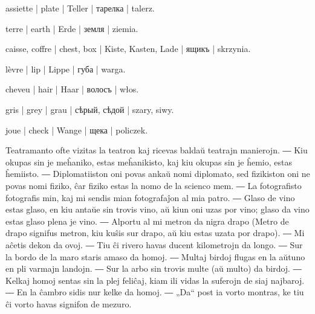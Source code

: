\begin{ekzvocab}{1em}
 assiette | plate | Teller | тарелка | talerz.

 terre | earth | Erde | земля | ziemia.

 caisse, coffre | chest, box | Kiste, Kasten, Lade | ящикъ | skrzynia.

 lèvre | lip | Lippe | губа | warga.

 cheveu | hair | Haar | волосъ | włos.

 gris | grey | grau | сѣрый, сѣдой | szary, siwy.

 joue | check | Wange | щека | policzek.

\end{ekzvocab}



Teatramanto ofte vizitas la teatron kaj ricevas baldaŭ teatrajn manierojn. ― Kiu okupas sin je meĥaniko, estas meĥanikisto, kaj kiu okupas sin je ĥemio, estas ĥemiisto. ― Diplomatiiston oni povas ankaŭ nomi diplomato, sed fizikiston oni ne povas nomi fiziko, ĉar fiziko estas la nomo de la scienco mem. ― La fotografisto fotografis min, kaj mi sendis mian fotografaĵon al mia patro. ― Glaso de vino estas glaso, en kiu antaŭe sin trovis vino, aŭ kiun oni uzas por vino; glaso da vino estas glaso plena je vino. ― Alportu al mi metron da nigra drapo (Metro de drapo signifus metron, kiu kuŝis sur drapo, aŭ kiu estas uzata por drapo). ― Mi aĉetis dekon da ovoj. ― Tiu ĉi rivero havas ducent kilometrojn da longo. ― Sur la bordo de la maro staris amaso da homoj. ― Multaj birdoj flugas en la aŭtuno en pli varmajn landojn. ― Sur la arbo sin trovis multe (aŭ multo) da birdoj. ― Kelkaj homoj sentas sin la plej feliĉaj, kiam ili vidas la suferojn de siaj najbaroj. ― En la ĉambro sidis nur kelke da homoj. ― „Da“ post ia vorto montras, ke tiu ĉi vorto havas signifon de mezuro.

